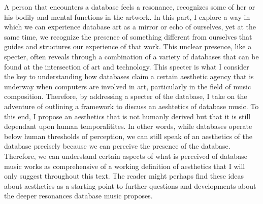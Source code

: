 A person that encounters a database feels a resonance, recognizes some of her or his bodily and mental functions in the artwork. In this part, I explore a way in which we can experience database art as a mirror or echo of ourselves, yet at the same time, we recognize the presence of something different from ourselves that guides and structures our experience of that work. This unclear presence, like a specter, often reveals through a combination of a variety of databases that can be found at the intersection of art and technology. This specter is what I consider the key to understanding how databases claim a certain aesthetic agency that is underway when computers are involved in art, particularly in the field of music composition. Therefore, by addressing a specter of the database, I take on the adventure of outlining a framework to discuss an aeshtetics of database music. To this end, I propose an aesthetics that is not humanly derived but that it is still dependant upon human temporalitites. In other words, while databases operate below human thresholds of perception, we can still speak of an aesthetics of the database precisely because we can perceive the presence of the database. Therefore, we can understand certain aspects of what is perceived of database music works as comprehensive of a working definition of aesthetics that I will only suggest throughout this text. The reader might perhaps find these ideas about aesthetics as a starting point to further questions and developments about the deeper resonances database music proposes. 

